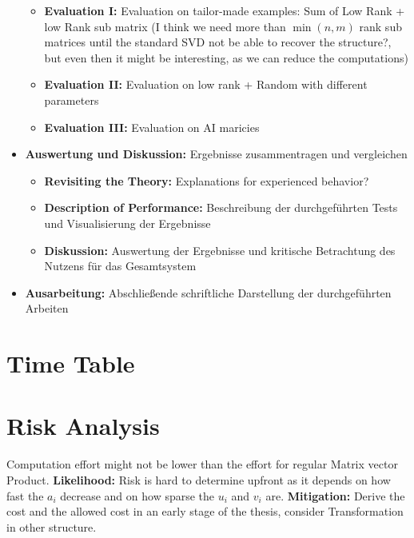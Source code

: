\documentclass[lang=ngerman,inputenc=utf8,fontsize=10pt]{ldvarticle}
\begin{document}
\begin{itemize}
\begin{itemize}
			\item \textbf{Evaluation I:} Evaluation on tailor-made examples: Sum of Low Rank + low Rank sub matrix (I think we need more than $\min(n,m)$ rank sub matrices until the standard SVD not be able to recover the structure?, but even then it might be interesting, as we can reduce the computations)
			\item \textbf{Evaluation II:} Evaluation on low rank + Random with different parameters
			\item \textbf{Evaluation III:} Evaluation on AI maricies
		\end{itemize}
	\item \textbf{Auswertung und Diskussion:} Ergebnisse zusammentragen und vergleichen
		\begin{itemize}
			\item \textbf{Revisiting the Theory:} Explanations for experienced behavior?
			\item \textbf{Description of Performance:} Beschreibung der durchgeführten Tests und Visualisierung der Ergebnisse
			\item \textbf{Diskussion:} Auswertung der Ergebnisse und kritische Betrachtung des Nutzens für das Gesamtsystem
		\end{itemize}
	\item \textbf{Ausarbeitung:} Abschließende schriftliche Darstellung der durchgeführten Arbeiten
\end{itemize}

\section{Time Table}


	
	
	




\section{Risk Analysis}

Computation effort might not be lower than the effort for regular Matrix vector Product. 
\newline\textbf{Likelihood:} Risk is hard to determine upfront as it depends on how fast the $a_i$ decrease and on how sparse the $u_i$ and $v_i$ are. 
\newline\textbf{Mitigation:} Derive the cost and the allowed cost in an early stage of the thesis, consider Transformation in other structure.
\end{document}
